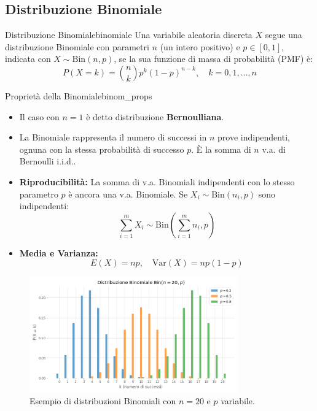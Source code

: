 \subsection{Distribuzione Binomiale}

\begin{definizione}{Distribuzione Binomiale}{binomiale}
Una variabile aleatoria discreta \(X\) segue una distribuzione Binomiale con parametri \(n\) (un intero positivo) e \(p \in [0,1]\), indicata con \(X \sim \text{Bin}(n,p)\), se la sua funzione di massa di probabilità (PMF) è:
\[
P(X=k) = \binom{n}{k} p^k (1-p)^{n-k}, \quad k=0, 1, \dots, n \text{}
\]
\end{definizione}

\begin{proposizione}{Proprietà della Binomiale}{binom_props}
\begin{itemize}
    \item Il caso con \(n=1\) è detto distribuzione \textbf{Bernoulliana}.
    \item La Binomiale rappresenta il numero di successi in \(n\) prove indipendenti, ognuna con la stessa probabilità di successo \(p\). È la somma di \(n\) v.a. di Bernoulli i.i.d..
    \item \textbf{Riproducibilità:} La somma di v.a. Binomiali indipendenti con lo stesso parametro \(p\) è ancora una v.a. Binomiale. Se \(X_i \sim \text{Bin}(n_i, p)\) sono indipendenti:
    \[ \sum_{i=1}^{m} X_i \sim \text{Bin}\left(\sum_{i=1}^{m} n_i, p\right) \text{} \]
    \item \textbf{Media e Varianza:}
    \[ E(X) = np, \quad \text{Var}(X) = np(1-p) \]
\end{itemize}
\end{proposizione}

\begin{figure}[H]
    \centering
    \includegraphics[width=0.8\textwidth]{images/th_01_03/binomiale.png}
    \caption{Esempio di distribuzioni Binomiali con \(n = 20\) e \(p\) variabile.}
    \label{fig:binomiale}
\end{figure}

